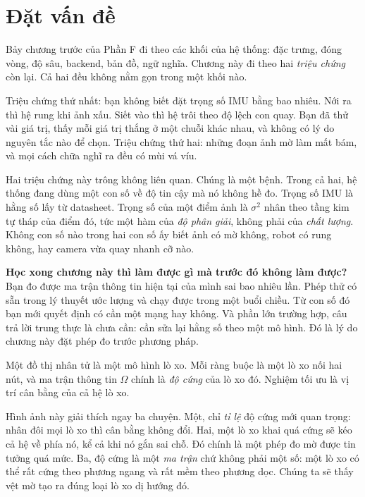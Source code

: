 \documentclass[../../deep_learning.tex]{subfiles}
\begin{document}
\section{Đặt vấn đề}

Bảy chương trước của Phần F đi theo các khối của hệ thống: đặc trưng, đóng vòng, độ sâu, backend, bản đồ, ngữ nghĩa. Chương này đi theo hai \emph{triệu chứng} còn lại. Cả hai đều không nằm gọn trong một khối nào.

Triệu chứng thứ nhất: bạn không biết đặt trọng số IMU bằng bao nhiêu. Nới ra thì hệ rung khi ảnh xấu. Siết vào thì hệ trôi theo độ lệch con quay. Bạn đã thử vài giá trị, thấy mỗi giá trị thắng ở một chuỗi khác nhau, và không có lý do nguyên tắc nào để chọn. Triệu chứng thứ hai: những đoạn ảnh mờ làm mất bám, và mọi cách chữa nghĩ ra đều có mùi vá víu.

Hai triệu chứng này trông không liên quan. Chúng là một bệnh. Trong cả hai, hệ thống đang dùng một con số về độ tin cậy mà nó không hề đo. Trọng số IMU là hằng số lấy từ datasheet. Trọng số của một điểm ảnh là \(\sigma^2\) nhân theo tầng kim tự tháp của điểm đó, tức một hàm của \emph{độ phân giải}, không phải của \emph{chất lượng}. Không con số nào trong hai con số ấy biết ảnh có mờ không, robot có rung không, hay camera vừa quay nhanh cỡ nào.

\textbf{Học xong chương này thì làm được gì mà trước đó không làm được?} Bạn đo được ma trận thông tin hiện tại của mình sai bao nhiêu lần. Phép thử có sẵn trong lý thuyết ước lượng và chạy được trong một buổi chiều. Từ con số đó bạn mới quyết định có cần một mạng hay không. Và phần lớn trường hợp, câu trả lời trung thực là chưa cần: cần sửa lại hằng số theo một mô hình. Đó là lý do chương này đặt phép đo trước phương pháp.

\begin{trucgiac}
Một đồ thị nhân tử là một mô hình lò xo. Mỗi ràng buộc là một lò xo nối hai nút, và ma trận thông tin \(\Omega\) chính là \emph{độ cứng} của lò xo đó. Nghiệm tối ưu là vị trí cân bằng của cả hệ lò xo.

Hình ảnh này giải thích ngay ba chuyện. Một, chỉ \emph{tỉ lệ} độ cứng mới quan trọng: nhân đôi mọi lò xo thì cân bằng không đổi. Hai, một lò xo khai quá cứng sẽ kéo cả hệ về phía nó, kể cả khi nó gắn sai chỗ. Đó chính là một phép đo mờ được tin tưởng quá mức. Ba, độ cứng là một \emph{ma trận} chứ không phải một số: một lò xo có thể rất cứng theo phương ngang và rất mềm theo phương dọc. Chúng ta sẽ thấy vệt mờ tạo ra đúng loại lò xo dị hướng đó.
\end{trucgiac}
\end{document}
